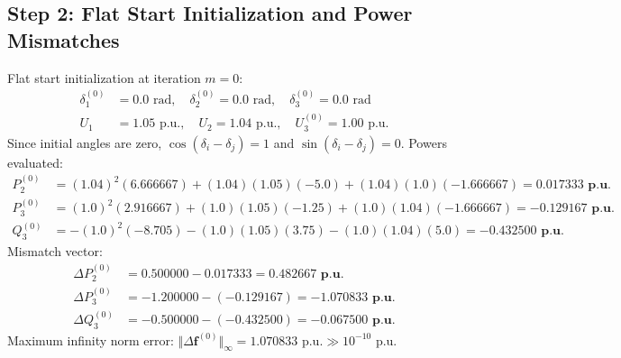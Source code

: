 \documentclass[12pt,a4paper,oneside]{report}
\begin{document}
\subsection{Step 2: Flat Start Initialization and Power Mismatches}
Flat start initialization at iteration $m = 0$:
\begin{align}
\delta_1^{(0)} &= 0.0\text{ rad}, \quad \delta_2^{(0)} = 0.0\text{ rad}, \quad \delta_3^{(0)} = 0.0\text{ rad} \\
U_1 &= 1.05\text{ p.u.}, \quad U_2 = 1.04\text{ p.u.}, \quad U_3^{(0)} = 1.00\text{ p.u.}
\end{align}
Since initial angles are zero, $\cos(\delta_i - \delta_j) = 1$ and $\sin(\delta_i - \delta_j) = 0$. Powers evaluated:
\begin{align}
P_2^{(0)} &= (1.04)^2(6.666667) + (1.04)(1.05)(-5.0) + (1.04)(1.0)(-1.666667) = \mathbf{0.017333\text{ p.u.}} \\
P_3^{(0)} &= (1.0)^2(2.916667) + (1.0)(1.05)(-1.25) + (1.0)(1.04)(-1.666667) = \mathbf{-0.129167\text{ p.u.}} \\
Q_3^{(0)} &= -(1.0)^2(-8.705) - (1.0)(1.05)(3.75) - (1.0)(1.04)(5.0) = \mathbf{-0.432500\text{ p.u.}}
\end{align}
Mismatch vector:
\begin{align}
\Delta P_2^{(0)} &= 0.500000 - 0.017333 = \mathbf{0.482667\text{ p.u.}} \\
\Delta P_3^{(0)} &= -1.200000 - (-0.129167) = \mathbf{-1.070833\text{ p.u.}} \\
\Delta Q_3^{(0)} &= -0.500000 - (-0.432500) = \mathbf{-0.067500\text{ p.u.}}
\end{align}
Maximum infinity norm error: $\Vert \Delta \mathbf{f}^{(0)} \Vert_\infty = 1.070833\text{ p.u.} \gg 10^{-10}\text{ p.u.}$
\end{document}
